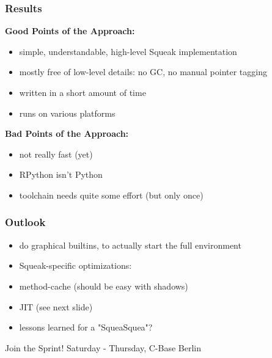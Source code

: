 \documentclass[utf8x]{beamer}
\begin{document}

\begin{frame}
    \frametitle{Results}
    {\bf Good Points of the Approach:}
    \begin{itemize}
    \item simple, understandable, high-level Squeak implementation
    \item mostly free of low-level details: no GC, no manual pointer tagging
    \item written in a short amount of time
    \item runs on various platforms
    \end{itemize}
    \pause
    {\bf Bad Points of the Approach:}
    \begin{itemize}
    \item not really fast (yet)
    \item RPython isn't Python
    \item toolchain needs quite some effort (but only once)
    \end{itemize}
\end{frame}


\begin{frame}
    \frametitle{Outlook}
    \begin{itemize}
    \item do graphical builtins, to actually start the full environment
    \item Squeak-specific optimizations:
    \item method-cache (should be easy with shadows)
    \item JIT (see next slide)
    \item lessons learned for a "SqueaSquea"?
    \end{itemize}
  \begin{block}{
    Join the Sprint!}
    \bigskip
    \hskip 1cm Saturday - Thursday, C-Base Berlin
    \bigskip
  \end{block}
\end{frame}
\end{document}
